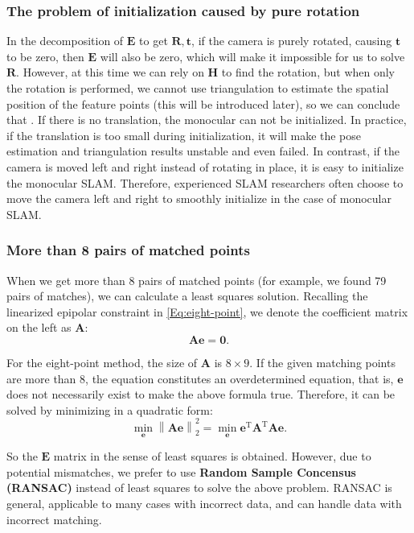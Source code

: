 \subsubsection{The problem of initialization caused by pure rotation}
In the decomposition of $\bm{E}$ to get $\bm{R}, \bm{t}$, if the camera is purely rotated, causing $\bm{t}$ to be zero, then $\bm{E}$ will also be zero, which will make it impossible for us to solve $\bm{R}$. However, at this time we can rely on $\bm{H}$ to find the rotation, but when only the rotation is performed, we cannot use triangulation to estimate the spatial position of the feature points (this will be introduced later), so we can conclude that . If there is no translation, the monocular can not be initialized. In practice, if the translation is too small during initialization, it will make the pose estimation and triangulation results unstable and even failed. In contrast, if the camera is moved left and right instead of rotating in place, it is easy to initialize the monocular SLAM. Therefore, experienced SLAM researchers often choose to move the camera left and right to smoothly initialize in the case of monocular SLAM.

\subsubsection{More than 8 pairs of matched points}
When we get more than 8 pairs of matched points (for example, we found 79 pairs of matches), we can calculate a least squares solution. Recalling the linearized epipolar constraint in \eqref{Eq:eight-point}, we denote the coefficient matrix on the left as $\bm{A}$:
\begin{equation}
\bm{A} \bm{e} = \bm{0} .
\end{equation}

For the eight-point method, the size of $\bm{A}$ is $8 \times 9$. If the given matching points are more than $8$, the equation constitutes an overdetermined equation, that is, $\bm{e}$ does not necessarily exist to make the above formula true. Therefore, it can be solved by minimizing in a quadratic form:
\begin{equation}
\mathop {\min }\limits_{\bm{e}} \left\| \bm{Ae} \right\|_2^2 = \mathop {\min }\limits_{\bm{e}} { \bm{e}^\mathrm{T}} {\bm{A}^\mathrm{T}} \bm{Ae}.
\end{equation}

So the $\bm{E}$ matrix in the sense of least squares is obtained. However, due to potential mismatches, we prefer to use \textbf{Random Sample Concensus (RANSAC)} instead of least squares to solve the above problem. RANSAC is general, applicable to many cases with incorrect data, and can handle data with incorrect matching.

